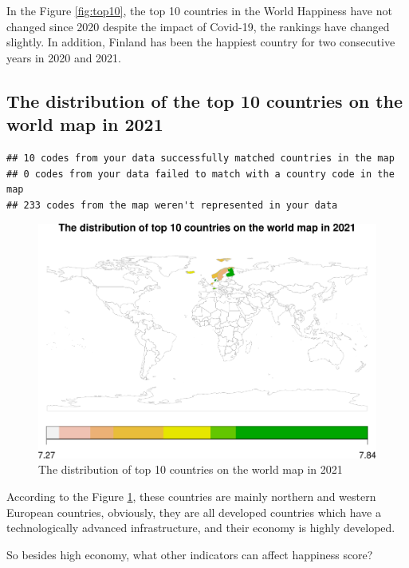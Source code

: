 \documentclass[11pt,a4paper,]{article}
\begin{document}
In the Figure \ref{fig:top10}, the top 10 countries in the World Happiness have not changed since 2020 despite the impact of Covid-19, the rankings have changed slightly.
In addition, Finland has been the happiest country for two consecutive years in 2020 and 2021.

\hypertarget{the-distribution-of-the-top-10-countries-on-the-world-map-in-2021}{%
\subsection{The distribution of the top 10 countries on the world map in 2021}\label{the-distribution-of-the-top-10-countries-on-the-world-map-in-2021}}

\begin{verbatim}
## 10 codes from your data successfully matched countries in the map
## 0 codes from your data failed to match with a country code in the map
## 233 codes from the map weren't represented in your data
\end{verbatim}

\begin{figure}
\centering
\includegraphics{Assignment4_files/figure-latex/top10map-1.pdf}
\caption{\label{fig:top10map}The distribution of top 10 countries on the world map in 2021}
\end{figure}

According to the Figure \ref{fig:top10map}, these countries are mainly northern and western European countries, obviously, they are all developed countries which have a technologically advanced infrastructure, and their economy is highly developed.

So besides high economy, what other indicators can affect happiness score?
\end{document}
